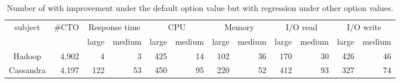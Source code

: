 \begin{table}[t]
\tabcolsep=0.04cm
\caption{Number of \instance with improvement under the default option value but with regression under other option values.}
    \begin{tabular}{|c|c|c|r|c|r|c|r|c|r|c|r|}
    \hline
    \multirow{2}{*}{subject} & \multirow{2}{*}{\#CTO}    & \multicolumn{2}{c|}{Response time}    & \multicolumn{2}{c|}{CPU}       & \multicolumn{2}{c|}{Memory}    & \multicolumn{2}{c|}{I/O read}  & \multicolumn{2}{c|}{I/O write} \\ \cline{3-12} 
     &   & large   & \multicolumn{1}{c|}{medium} & large   & \multicolumn{1}{c|}{medium} & large   & \multicolumn{1}{c|}{medium} & large   & \multicolumn{1}{c|}{medium} & large   & \multicolumn{1}{c|}{medium} \\ \hline
    Hadoop  & \multicolumn{1}{r|}{4,902} & \multicolumn{1}{r|}{4}   & 3   & \multicolumn{1}{r|}{425} & 14  & \multicolumn{1}{r|}{102} & 36  & \multicolumn{1}{r|}{170} & 30  & \multicolumn{1}{r|}{426} & 46  \\ \hline
    Cassandra                & \multicolumn{1}{r|}{4,197} & \multicolumn{1}{r|}{122} & 53  & \multicolumn{1}{r|}{450} & 95 & \multicolumn{1}{r|}{220} & 52  & \multicolumn{1}{r|}{412} & 93 & \multicolumn{1}{r|}{327} & 74  \\ \hline
    \end{tabular}
\label{tab:option_improvement_default}
\end{table}

